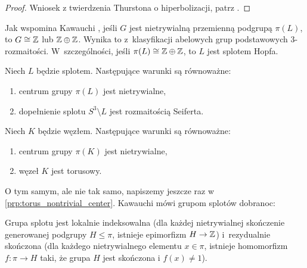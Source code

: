 \begin{proof}
    Wniosek z twierdzenia Thurstona o hiperbolizacji, patrz \cite[s. 76]{kawauchi1996}.
\end{proof}

Jak wspomina Kawauchi \cite[s. 83]{kawauchi1996}, jeśli $G$ jest nietrywialną przemienną podgrupą $\pi(L)$, to $G \cong \mathbb Z$ lub $\mathbb Z \oplus \mathbb Z$.
Wynika to z~klasyfikacji abelowych grup podstawowych 3-rozmaitości.
W~szczególności, jeśli $\pi(L) \cong \mathbb Z \oplus \mathbb Z$, to $L$ jest splotem Hopfa.

\begin{proposition}
    Niech $L$ będzie splotem.
    Następujące warunki są równoważne:
    \begin{enumerate}
    \item centrum grupy $\pi(L)$ jest nietrywialne,
    \item dopełnienie splotu $S^3 \setminus L$ jest rozmaitością Seiferta.
    \end{enumerate}
\end{proposition}

\begin{corollary}
    Niech $K$ będzie węzłem.
    Następujące warunki są równoważne:
    \begin{enumerate}
    \item centrum grupy $\pi(K)$ jest nietrywialne,
    \item węzeł $K$ jest torusowy.
    \end{enumerate}
\end{corollary}

O tym samym, ale nie tak samo, napiszemy jeszcze raz w \ref{prp:torus_nontrivial_center}.
Kawauchi \cite[s. 85]{kawauchi1996} mówi grupom splotów dobranoc:

\begin{proposition}
    Grupa splotu jest lokalnie indeksowalna (dla każdej  nietrywialnej skończenie generowanej podgrupy $H \le \pi$, istnieje epimorfizm $H \to \mathbb Z$) i~rezydualnie skończona (dla każdego nietrywialnego elementu $x \in \pi$, istnieje homomorfizm $f: \pi \to H$ taki, że grupa $H$ jest skończona i $f(x) \neq 1$).
\end{proposition}




